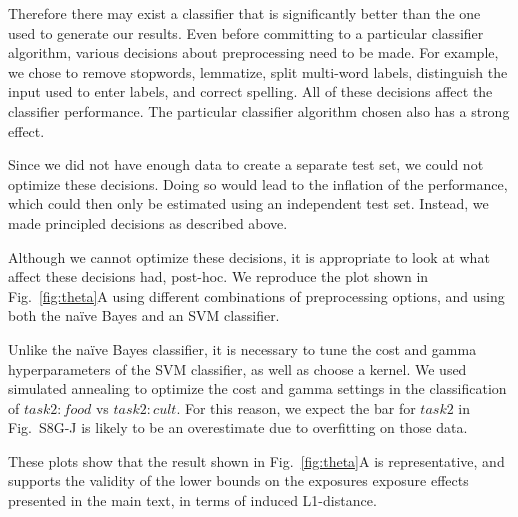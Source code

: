 \documentclass[12pt]{article}
\begin{document}
Therefore there may exist a classifier that is 
significantly better than the one used to generate our results.  Even before
committing to a particular classifier algorithm, various decisions about
preprocessing need to be made.  For example, we chose to remove stopwords,
lemmatize, split multi-word labels, distinguish the input used to enter 
labels, and correct spelling.  All of these decisions affect the classifier
performance.  The particular classifier algorithm chosen also has a strong 
effect.

Since we did not have enough data to create a separate test set, we could not
optimize these decisions.  Doing so would lead to the inflation of the 
performance, which could then only be estimated using an independent test set.
Instead, we made principled decisions as described above.

Although we cannot optimize these decisions, it is appropriate to look at
what affect these decisions had, post-hoc.  We reproduce the plot shown in 
Fig.~\ref{fig:theta}A using different combinations of preprocessing options,
and using both the na\"ive Bayes and an SVM classifier.

Unlike the na\"ive Bayes classifier, it is necessary to tune the cost and 
gamma hyperparameters of the SVM classifier, as well as choose a kernel.
We used simulated annealing to optimize the cost and gamma settings in the
classification of $task2:food$ vs $task2:cult$.  For this reason, we expect
the bar for $task2$ in Fig.~S8G-J is likely to be an overestimate due to
overfitting on those data.

These plots show that the result shown in Fig.~\ref{fig:theta}A is 
representative, and supports the validity of the lower bounds on the 
exposures exposure effects presented in the main text, in terms of induced 
L1-distance.
\end{document}
